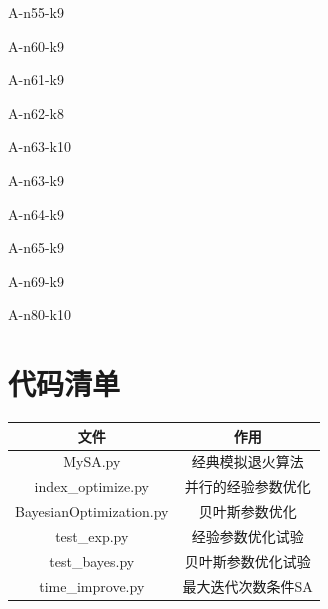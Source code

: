 \documentclass{nudt}
\begin{document}
\begin{appendix}
{	\noindent{\rule{\textwidth}{0.2mm}}
}
A-n55-k9
\fontsize{13pt}{12.5pt}\selectfont
{
	
	\noindent{\rule{\textwidth}{0.2mm}}
}
A-n60-k9
\fontsize{13pt}{12.5pt}\selectfont
{
	
	\noindent{\rule{\textwidth}{0.2mm}}
}
A-n61-k9
\fontsize{13pt}{12.5pt}\selectfont
{
	
	\noindent{\rule{\textwidth}{0.2mm}}
}
A-n62-k8
\fontsize{13pt}{12.5pt}\selectfont
{
	
	\noindent{\rule{\textwidth}{0.2mm}}
}
A-n63-k10
\fontsize{13pt}{12.5pt}\selectfont
{
	
	\noindent{\rule{\textwidth}{0.2mm}}
}
A-n63-k9
\fontsize{13pt}{12.5pt}\selectfont
{
	
	\noindent{\rule{\textwidth}{0.2mm}}
}
A-n64-k9
\fontsize{13pt}{12.5pt}\selectfont
{
	
	\noindent{\rule{\textwidth}{0.2mm}}
}
A-n65-k9
\fontsize{13pt}{12.5pt}\selectfont
{
	
	\noindent{\rule{\textwidth}{0.2mm}}
}
A-n69-k9
\fontsize{13pt}{12.5pt}\selectfont
{
	
	\noindent{\rule{\textwidth}{0.2mm}}
}
A-n80-k10
\fontsize{13pt}{12.5pt}\selectfont
{
	
	\noindent{\rule{\textwidth}{0.2mm}}
}
\section{代码清单}\label{appendix:code}
\begin{table}[H]
	\centering
	  \begin{tabular}{cc}
	  \toprule
	  文件  & 作用 \\
	  \midrule
	  MySA.py & 经典模拟退火算法 \\
	  index\_optimize.py & 并行的经验参数优化 \\
	  BayesianOptimization.py & 贝叶斯参数优化 \\
	  test\_exp.py & 经验参数优化试验 \\
	  test\_bayes.py & 贝叶斯参数优化试验 \\
	  time\_improve.py & 最大迭代次数条件SA \\
	  \bottomrule
	  \end{tabular}%
  \end{table}%
\vspace{-15pt}
\end{appendix}
\end{document}

